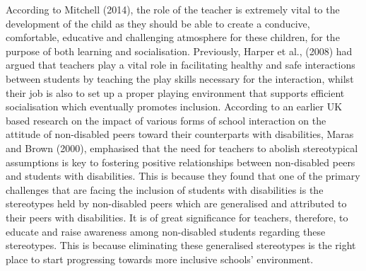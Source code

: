\documentclass[11.5pt]{sig-alternate}
\begin{document}
\begin{large}
According to Mitchell (2014), the role of the teacher is extremely vital to the development of the child as they should be able to create a conducive, comfortable, educative and challenging atmosphere for these children, for the purpose of both learning and socialisation. Previously, Harper et al., (2008) had argued that teachers play a vital role in facilitating healthy and safe interactions between students by teaching the play skills necessary for the interaction, whilst their job is also to set up a proper playing environment that supports efficient socialisation which eventually promotes inclusion. According to an earlier UK based research on the impact of various forms of school interaction on the attitude of non-disabled peers toward their counterparts with disabilities, Maras and Brown (2000), emphasised that the need for teachers to abolish stereotypical assumptions is key to fostering positive relationships between non-disabled peers and students with disabilities. This is because they found that one of the primary challenges that are facing the inclusion of students with disabilities is the stereotypes held by non-disabled peers which are generalised and attributed to their peers with disabilities. It is of great significance for teachers, therefore, to educate and raise awareness among non-disabled students regarding these stereotypes. This is because eliminating these generalised stereotypes is the right place to start progressing towards more inclusive schools’ environment. 


\end{large}
\end{document}
